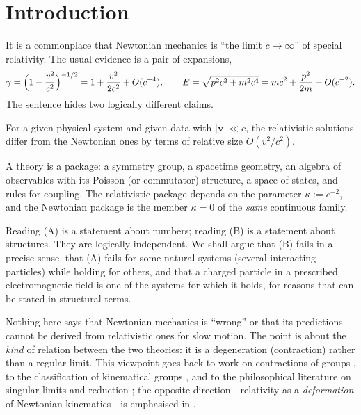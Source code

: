 \documentclass[11pt,a4paper]{article}
\newcommand{\bv}{\mathbf{v}}
\theoremstyle{plain}
\theoremstyle{definition}
\theoremstyle{remark}
\begin{document}
\section{Introduction}
It is a commonplace that Newtonian mechanics is ``the limit $c\to\infty$'' of special
relativity. The usual evidence is a pair of expansions,
\begin{equation}\label{eq:expansions}
\gamma=\Bigl(1-\frac{v^2}{c^2}\Bigr)^{-1/2}=1+\frac{v^2}{2c^2}+O(c^{-4}),
\qquad
E=\sqrt{p^2c^2+m^2c^4}=mc^2+\frac{p^2}{2m}+O(c^{-2}).
\end{equation}
The sentence hides two logically different claims.
\begin{description}[leftmargin=1.2cm,style=nextline]
\item[(A) Asymptotic reading.] For a given physical system and given data with $|\bv|\ll c$,
the relativistic solutions differ from the Newtonian ones by terms of relative size
$O(v^2/c^2)$.
\item[(B) Structural reading.] A theory is a package: a symmetry group, a spacetime geometry,
an algebra of observables with its Poisson (or commutator) structure, a space of states,
and rules for coupling. The relativistic package depends on the parameter
$\kappa:=c^{-2}$, and the Newtonian package is the member $\kappa=0$ of the \emph{same}
continuous family.
\end{description}
Reading (A) is a statement about numbers; reading (B) is a statement about structures.
They are logically independent. We shall argue that (B) fails in a precise sense, that (A) fails for
some natural systems (several interacting particles) while holding for others, and that a charged
particle in a prescribed electromagnetic field is one of the systems for which it holds, for
reasons that can be stated in structural terms.

Nothing here says that Newtonian mechanics is ``wrong'' or that its predictions cannot be derived
from relativistic ones for slow motion. The point is about the \emph{kind} of relation between the
two theories: it is a degeneration (contraction) rather than a regular limit. This viewpoint goes
back to work on contractions of groups \cite{Segal51,IW53,Saletan61}, to the classification of
kinematical groups \cite{BLL68}, and to the philosophical literature on singular limits and
reduction \cite{Nickles73,Berry94,Batterman02}; the opposite direction---relativity as a
\emph{deformation} of Newtonian kinematics---is emphasised in \cite{Dyson72,VM94}.
\end{document}
